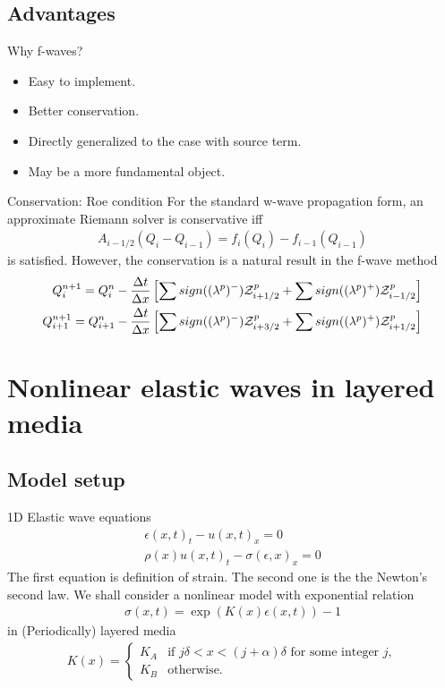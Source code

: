 \documentclass{beamer}
\begin{document}
\subsection{Advantages}
\begin{frame}{Why f-waves?}
\begin{itemize}
\item Easy to implement.
\item Better conservation.
\item Directly generalized to the case with source term.
\item May be a more fundamental object.
\end{itemize}
\end{frame}

\begin{frame}{Conservation: Roe condition}
For the standard w-wave propagation form, an approximate Riemann solver is conservative iff
\begin{align*}
A_{i-1/2}(Q_i-Q_{i-1})=f_{i}(Q_i)-f_{i-1}(Q_{i-1})
\end{align*}
is satisfied. However, the conservation is a natural result in the f-wave method
\begin{align*}
Q_i^{n+1}=Q_i^{n}-\frac{\Delta t}{\Delta x}\left[\sum sign((\lambda^p)^-) {\cal Z}_{i+1/2}^p+\sum sign((\lambda^p)^+) {\cal Z}_{i-1/2}^p\right] \\
Q_{i+1}^{n+1}=Q_{i+1}^{n}-\frac{\Delta t}{\Delta x}\left[\sum sign((\lambda^p)^-) {\cal Z}_{i+3/2}^p+\sum sign((\lambda^p)^+) {\cal Z}_{i+1/2}^p\right]
\end{align*}
\end{frame}

\section{Nonlinear elastic waves in layered media}
\subsection{Model setup}
\begin{frame}{1D Elastic wave equations}
\begin{align*}
\epsilon(x,t)_t-u(x,t)_x=0 \\
\rho(x) u(x,t)_t-\sigma(\epsilon,x)_x=0
\end{align*}
The first equation is definition of strain. The second one is the the Newton's second law. We shall consider a nonlinear model with exponential relation
\begin{align*}
\sigma(x,t)=\exp(K(x)\epsilon(x,t))-1
\end{align*}
in (Periodically) layered media
\begin{align*}
K(x)=\left\{
\begin{array}{cc}
K_A & \mbox{if }j\delta<x<(j+\alpha)\delta \mbox{ for some integer } j,\\
K_B & \mbox{otherwise.}
\end{array}
\right.
\end{align*}
\end{frame}
\end{document}
